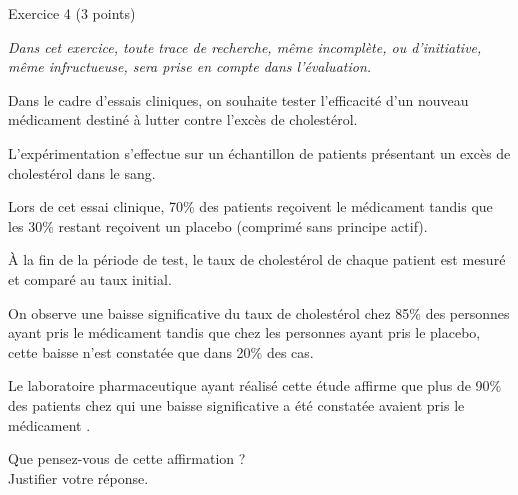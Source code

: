 
%
\begin{h2}Exercice 4 (3 points)\end{h2}
\par
\textit{Dans cet exercice, toute trace de recherche, même incomplète, ou d'initiative, même infructueuse, sera prise en compte dans l'évaluation.}
\par


Dans le cadre d'essais cliniques, on souhaite tester l'efficacité d'un nouveau médicament destiné à lutter contre l'excès de cholestérol.
\par
L'expérimentation s'effectue sur un échantillon de patients présentant un excès de cholestérol dans le sang.
\par
Lors de cet essai clinique, 70\% des patients reçoivent le médicament tandis que les 30\% restant reçoivent un placebo (comprimé sans principe actif).
\par
\`A la fin de la période de test, le taux de cholestérol de chaque patient est mesuré et comparé au taux initial.
\par
On observe une baisse significative du taux de cholestérol chez 85\% des personnes ayant pris le médicament tandis que chez les personnes ayant pris le placebo, cette baisse n'est constatée que dans 20\% des cas.
\par
Le laboratoire pharmaceutique ayant réalisé cette étude affirme que \og plus de 90\% des patients chez qui une baisse significative a été constatée avaient pris le médicament \fg{}.
\par
Que pensez-vous de cette affirmation ? \\
Justifier votre réponse.
